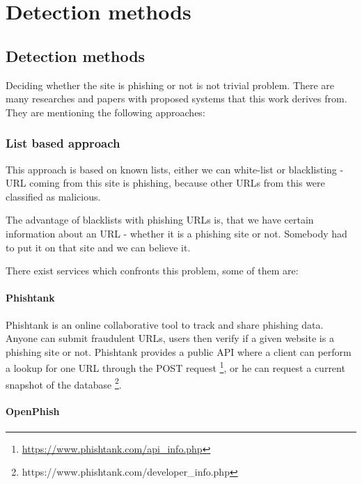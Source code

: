 \documentclass[
  digital, %
  oneside, %
  table,   %
  nolof,     %
  nolot,     %
]{fithesis3}
\begin{document}
\chapter{Detection methods}

\section{Detection methods}

Deciding whether the site is phishing or not is not trivial problem. There are many researches and papers with proposed systems that this work derives from. They are mentioning the following approaches:

\subsection{List based approach}

This approach is based on known lists, either  we can white-list or blacklisting - URL coming from this site is phishing, because other URLs from this were classified as malicious. 

The advantage of blacklists with phishing URLs is, that we have certain information about an URL - whether it is a phishing site or not. Somebody had to put it on that site and we can believe it.

There exist services which confronts this problem, some of them are:

\subsubsection{Phishtank}

Phishtank \cite{phishtank} is an online collaborative tool to track and share phishing data. Anyone can submit fraudulent URLs, users then verify if a given website is a phishing site or not. Phishtank provides a public API  where a client can perform a lookup for one URL through the POST request \footnote{\href{https://www.phishtank.com/api_info.php}{https://www.phishtank.com/api\_info.php}}, or he can request a current snapshot of the database \footnote{https://www.phishtank.com/developer\_info.php}. 

\subsubsection{OpenPhish}
\end{document}
